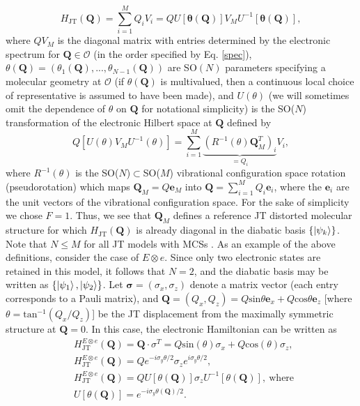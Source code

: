 \documentclass[superscriptaddress,showpacs,amsmath,amssymb,pra,twocolumn]{revtex4-1}
\begin{document}
\begin{equation}
H_{\text{JT}}(\mathbf{Q})=\sum_{i=1}^{M}Q_{i}V_{i}=QU[\mathbf{\theta}(\mathbf{Q})]V_{M}U^{-1}[\mathbf{\theta}(\mathbf{Q})],
\end{equation}
where $QV_{M}$ is the diagonal matrix with entries determined by the electronic
spectrum for $\mathbf{Q}\in\mathcal{O}$ (in the order specified by
Eq. \ref{spec}), $\theta(\mathbf{Q})=(\theta_{1}(\mathbf{Q}),...,\theta_{N-1}(\mathbf{Q}))$
are SO$(N)$ parameters specifying a molecular geometry at $\mathcal{O}$
(if $\theta(\mathbf{Q})$ is multivalued, then a continuous local
choice of representative is assumed to have been made), and $U(\theta)$
(we will sometimes omit the dependence of $\theta$ on $\mathbf{Q}$
for notational simplicity) is the SO($N$) transformation of the electronic
Hilbert space at $\mathbf{Q}$ defined by 
\begin{equation}
Q[U(\theta)V_{M}U^{-1}(\theta)]=\sum_{i=1}^{M}\underbrace{(R^{-1}(\theta)\mathbf{Q}_{M}^T)_{i}}_{=Q_{i}}V_{i},
\end{equation}
where $R^{-1}(\theta)$ is the SO($N$)$\subset$SO($M$) vibrational
configuration space rotation (pseudorotation) which maps $\mathbf{Q}_{M}=Q\mathbf{e}_{M}$
into $\mathbf{Q}=\sum_{i=1}^{M}Q_{i}\mathbf{e}_{i}$, where the $\mathbf{e}_{i}$
are the unit vectors of the vibrational configuration space. For the sake of simplicity we chose $F=1$. Thus, we see that $\mathbf{Q}_M$ defines a reference JT distorted molecular structure for which $H_{\text{JT}}(\mathbf{Q})$ is already diagonal in the diabatic basis $\{\ket{\psi_k}\}$. Note
that $N\leq M$ for all JT models with MCSs \cite{pooler_continuous_1978, pooler_continuous_1980,judd_group_1982,ribeiro_continuous_2017}. As an example of the above definitions, consider the case of $E \otimes e$. Since only two electronic states are retained in this model, it follows that $N = 2$, and the diabatic basis may be written as $\{\ket{\psi_1},\ket{\psi_2}\}$. Let $\mathbf{\sigma} = (\sigma_x,\sigma_z)$ denote a matrix vector (each entry corresponds to a Pauli matrix), and $\mathbf{Q}  = (Q_x, Q_z) = Q \text{sin}\theta \mathbf{e}_x+ Q \text{cos}\theta \mathbf{e}_z$ [where $\theta = \text{tan}^{-1}(Q_x/Q_z)$] be the JT displacement from the maximally symmetric structure at $\mathbf{Q}=0$. In this case, the electronic Hamiltonian can be written as
\small
\begin{align}  
& H_{\text{JT}}^{E\otimes e} (\mathbf{Q}) = \mathbf{Q}\cdot \sigma^T = 
Q \text{sin} (\theta) \sigma_x+Q\text{cos}(\theta) \sigma_z , \\ & H_{\text{JT}}^{E\otimes e} (\mathbf{Q})  = Qe^{-i\sigma_y \theta/2}\sigma_z e^{i \sigma_y \theta/2}, \\
& H_{\text{JT}}^{E\otimes e} (\mathbf{Q}) = QU[\theta(\mathbf{Q})]\sigma_zU^{-1}[\theta(\mathbf{Q})],~\text{where}~ \\ & U[\theta(\mathbf{Q})]  = e^{-i \sigma_y \theta(\mathbf{Q})/2}.\end{align}
\end{document}

